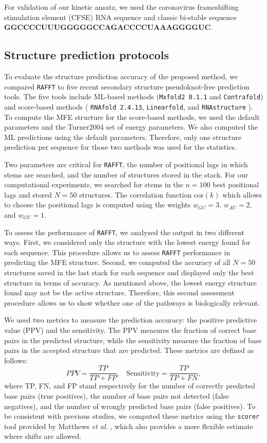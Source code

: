For validation of our kinetic ansatz, we used the coronavirus frameshifting stimulation element (CFSE) RNA sequence and classic bi-stable sequence \textbf{GGCCCCUUUGGGGGCCAGACCCCUAAAGGGGUC}.

\subsection{Structure prediction protocols}

To evaluate the structure prediction accuracy of the proposed method, we compared \texttt{RAFFT} to five recent secondary structure pseudoknot-free prediction tools. The five tools include ML-based methods (\texttt{Mxfold2 0.1.1} and \texttt{Contrafold}) and score-based methods ( \texttt{RNAfold 2.4.13},  \texttt{Linearfold},  and \texttt{RNAstructure} ). To compute the MFE structure for the score-based methods, we used the default parameters and the Turner2004 set of energy parameters. We also computed the ML predictions using the default parameters. Therefore, only one structure prediction per sequence for those two methods was used for the statistics.

Two parameters are critical for \texttt{RAFFT}, the number of positional lags in which stems are searched, and the number of structures stored in the stack. For our computational experiments, we searched for stems in the $n=100$ best positional lags and stored $N=50$ structures. The correlation function \(\text{cor}(k)\) which allows to choose the positional lags is computed using the weights \(w_{GC}=3\), \(w_{AU}=2\), and \(w_{GU}=1\).

To assess the performance of \texttt{RAFFT}, we analyzed the output in two different ways. First, we considered only the structure with the lowest energy found for each sequence. This procedure allows us to assess \texttt{RAFFT} performance in predicting the MFE structure. Second, we computed the accuracy of all $N=50$ structures saved in the last stack for each sequence and displayed only the best structure in terms of accuracy. As mentioned above, the lowest energy structure found may not be the active structure. Therefore, this second assessment procedure allows us to show whether one of the pathways is biologically relevant.

We used two metrics to measure the prediction accuracy: the positive predictive value (PPV) and the sensitivity. The PPV measures the fraction of correct base pairs in the predicted structure, while the sensitivity measure the fraction of base pairs in the accepted structure that are predicted. These metrics are defined as follows:
\begin{equation}
PPV = \frac{TP}{TP + FP}, \;\;\; \text{Sensitivity} = \frac{TP}{TP+FN},
\end{equation}
where TP, FN, and FP stand respectively for the number of correctly predicted base pairs (true positives), the number of base pairs not detected (false negatives), and the number of wrongly predicted base pairs (false positives). To be consistent with previous studies, we computed these metrics using the \texttt{scorer} tool provided by Matthews \emph{et al.} \cite{mathews19_how_to_bench_rna_secon}, which also provides a more flexible estimate where shifts are allowed.


